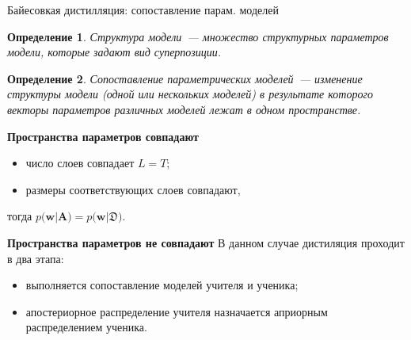 \documentclass[10pt,pdf,hyperref={unicode}]{beamer}
\newtheorem{rusdefinition}{Определение}
\begin{document}
\begin{frame}{Байесовкая дистилляция: сопоставление парам. моделей}
\begin{rusdefinition}
Структура модели~--- множество структурных параметров модели, которые задают вид суперпозиции.
\end{rusdefinition}

\begin{rusdefinition}
Сопоставление параметрических моделей~--- изменение структуры модели (одной или нескольких моделей) в результате которого векторы параметров различных моделей лежат в одном пространстве.
\end{rusdefinition}


\textbf{Пространства параметров совпадают}
\begin{itemize}
    \item число слоев совпадает $L=T$;
    \item размеры соответствующих слоев совпадают,
\end{itemize}
тогда $p\bigr(\mathbf{w}|\mathbf{A}\bigr) = p\bigr(\mathbf{w}|\mathfrak{D}\bigr)$.

\textbf{Пространства параметров не совпадают}
В данном случае дистиляция проходит в два этапа:
\begin{itemize}
    \item выполняется сопоставление моделей учителя и ученика;
    \item апостериорное распределение учителя назначается априорным распределением ученика.
\end{itemize}

\end{frame}
\end{document}
